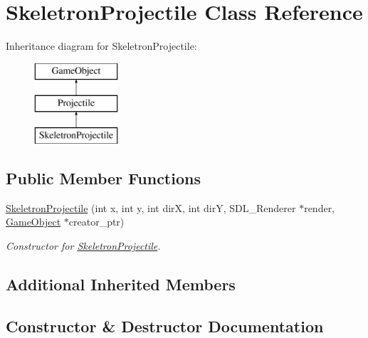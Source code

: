 \hypertarget{class_skeletron_projectile}{}\section{Skeletron\+Projectile Class Reference}
\label{class_skeletron_projectile}
Inheritance diagram for Skeletron\+Projectile\+:\begin{figure}[H]
\begin{center}
\leavevmode
\includegraphics[height=3.000000cm]{class_skeletron_projectile}
\end{center}
\end{figure}
\subsection*{Public Member Functions}
\begin{DoxyCompactItemize}
\item 
\hyperlink{class_skeletron_projectile_ab8c5623726cf166d0220ac69d8bfbc1a}{Skeletron\+Projectile} (int x, int y, int dir\+X, int dir\+Y, S\+D\+L\+\_\+\+Renderer $\ast$render, \hyperlink{class_game_object}{Game\+Object} $\ast$creator\+\_\+ptr)
\begin{DoxyCompactList}\small\item\em Constructor for \hyperlink{class_skeletron_projectile}{Skeletron\+Projectile}. \end{DoxyCompactList}\end{DoxyCompactItemize}
\subsection*{Additional Inherited Members}


\subsection{Constructor \& Destructor Documentation}
\hypertarget{class_skeletron_projectile_ab8c5623726cf166d0220ac69d8bfbc1a}{}
